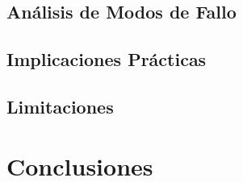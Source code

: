 \documentclass[runningheads]{llncs}
\begin{document}
\subsection{An\'alisis de Modos de Fallo}
\label{sec:failures}

\subsection{Implicaciones Pr\'acticas}
\label{sec:implications}

\subsection{Limitaciones}
\label{sec:limitations}

%
\section{Conclusiones}
\label{sec:conclusions}
\end{document}
